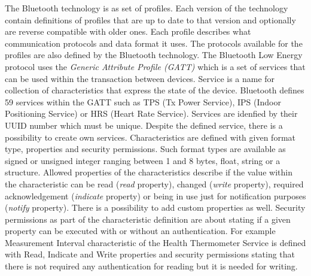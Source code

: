 \documentclass[../main.tex]{subfiles}
\begin{document}
The Bluetooth technology is as set of profiles. Each version of the technology contain definitions of profiles that are up to date to that version and optionally are reverse compatible with older ones. Each profile describes what communication protocols and data format it uses. The protocols available for the profiles are also defined by the Bluetooth technology. The Bluetooth Low Energy protocol uses the \textit{Generic Attribute Profile (GATT)} which is a set of services that can be used within the transaction between devices. Service is a name for collection of characteristics that express the state of the device. Bluetooth defines 59 services within the GATT such as TPS (Tx Power Service), IPS (Indoor Positioning Service) or HRS (Heart Rate Service). Services are idenfied by their UUID number which must be unique. Despite the defined service, there is a possibility to create own services. Characteristics are defined with given format type, properties and security permissions. Such format types are available as signed or unsigned integer ranging between 1 and 8 bytes, float, string or a structure. Allowed properties of the characteristics describe if the value within the characteristic can be read (\textit{read} property), changed (\textit{write} property), required acknowledgement (\textit{indicate} property) or being in use just for notification purposes (\textit{notify} property). There is a possibility to add custom properties as well. Security permissions as part of the characteristic definition are about stating if a given property can be executed with or without an authentication. For example Measurement Interval characteristic of the Health Thermometer Service is defined with Read, Indicate and Write properties and security permissions stating that there is not required any authentication for reading but it is needed for writing.
\end{document}
